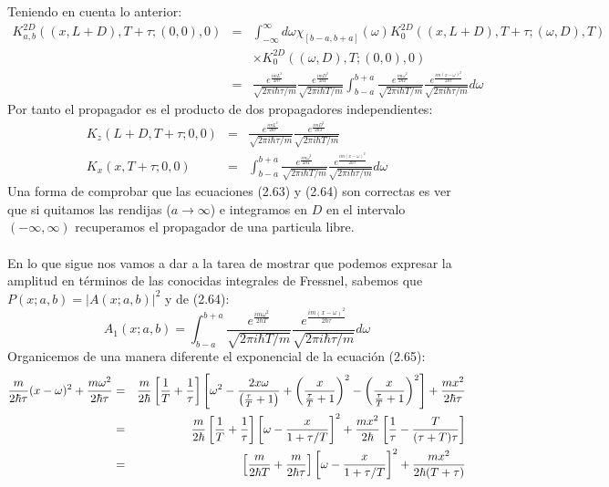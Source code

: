 Teniendo en cuenta lo anterior:
\begin{eqnarray}
\nonumber K_{a,b}^{2D}((x,L+D),T+\tau;(0,0),0)&=&\int_{-\infty}^{\infty}d\omega\chi_{[b-a,b+a]}(\omega)K_{0}^{2D}((x,L+D),T+\tau;(\omega,D),T)\\
&&\nonumber \times K_{0}^{2D}((\omega,D),T;(0,0),0)\\
&=&\nonumber \frac{e^{\frac{imL^{2}}{2\hbar\tau}}}{\sqrt{2\pi i\hbar\tau/m}}\frac{e^{\frac{imD^{2}}{2\hbar T}}}{\sqrt{2\pi i\hbar T/m}}\int_{b-a}^{b+a}\frac{e^{\frac{im\omega^{2}}{2\hbar T}}}{\sqrt{2\pi i\hbar T/m}}\frac{e^{\frac{im(x-\omega)^{2}}{2\hbar\tau}}}{\sqrt{2\pi i\hbar\tau/m}}d\omega 	
\end{eqnarray}
Por tanto el propagador es el producto de dos propagadores independientes:
\begin{eqnarray}
K_z(L+D,T+\tau;0,0)&=&\frac{e^{\frac{imL^{2}}{2\hbar\tau}}}{\sqrt{2\pi i\hbar\tau/m}}\frac{e^{\frac{imD^{2}}{2\hbar T}}}{\sqrt{2\pi i\hbar T/m}}\\
K_x(x,T+\tau;0,0)&=&\int_{b-a}^{b+a}\frac{e^{\frac{im\omega^{2}}{2\hbar T}}}{\sqrt{2\pi i\hbar T/m}}\frac{e^{\frac{im(x-\omega)^{2}}{2\hbar\tau}}}{\sqrt{2\pi i\hbar\tau/m}}d\omega
\end{eqnarray}
Una forma de comprobar que las ecuaciones (2.63) y (2.64) son correctas es ver que si quitamos las rendijas ($a\to \infty$) e integramos en $D$ en el intervalo $(-\infty,\infty)$ recuperamos el propagador de una particula libre.\\
\\
En lo que sigue nos vamos a dar a la tarea de mostrar que podemos expresar la amplitud en términos de las conocidas integrales de Fressnel, sabemos que $P(x;a,b)=|A(x;a,b)|^2$ y de (2.64):
\begin{equation}
A_1(x;a,b)=\int_{b-a}^{b+a}\frac{e^{\frac{im\omega^{2}}{2\hbar T}}}{\sqrt{2\pi i\hbar T/m}}\frac{e^{\frac{im(x-\omega)^{2}}{2\hbar\tau}}}{\sqrt{2\pi i\hbar\tau/m}}d\omega
\end{equation} 
Organicemos de una manera diferente el exponencial de la ecuación (2.65):
\begin{eqnarray}
\nonumber \frac{m}{2\hbar\tau}(x-\omega)^{2}+\frac{m\omega^{2}}{2\hbar\tau}&=&\frac{m}{2\hbar}\left[\frac{1}{T}+\frac{1}{\tau}\right]\left[\omega^{2}-\frac{2x\omega}{\left(\frac{\tau}{T}+1\right)}+\left(\frac{x}{\frac{\tau}{T}+1}\right)^{2}-\left(\frac{x}{\frac{\tau}{T}+1}\right)^{2}\right]+\frac{mx^{2}}{2\text{\ensuremath{\hbar\tau}}}\\
&=&\nonumber \frac{m}{2\hbar}\left[\frac{1}{T}+\frac{1}{\tau}\right]\left[\omega-\frac{x}{1+\tau/T}\right]^{2}+\frac{mx^{2}}{2\text{\ensuremath{\hbar}}}\left[\frac{1}{\tau}-\frac{T}{(\tau+T)\tau}\right]\\
&=& \left[\frac{m}{2\hbar T}+\frac{m}{2\hbar\tau}\right]\left[\omega-\frac{x}{1+\tau/T}\right]^{2}+\frac{mx^{2}}{2\text{\ensuremath{\hbar}}(T+\tau)}
\end{eqnarray}

